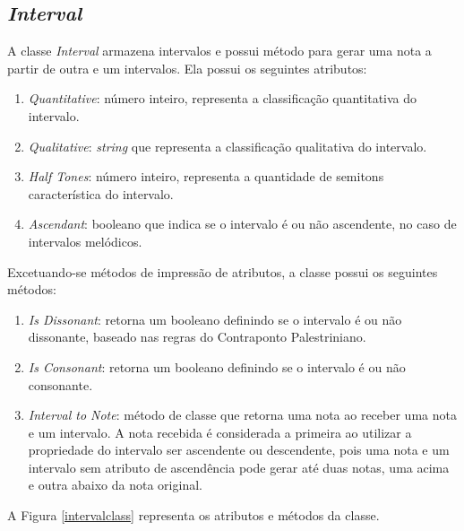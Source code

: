    \subsection[\textit{Interval}]{\textit{Interval}}

      A classe \textit{Interval} armazena intervalos e possui método para gerar uma nota a partir de outra e um intervalos. Ela possui os seguintes atributos:

      \begin{enumerate}
        \item \textit{Quantitative}: número inteiro, representa a classificação quantitativa do intervalo.
        \item \textit{Qualitative}: \textit{string} que representa a classificação qualitativa do intervalo.
        \item \textit{Half Tones}: número inteiro, representa a quantidade de semitons característica do intervalo.
        \item \textit{Ascendant}: booleano que indica se o intervalo é ou não ascendente, no caso de intervalos melódicos.
      \end{enumerate}

      Excetuando-se métodos de impressão de atributos, a classe possui os seguintes métodos:

      \begin{enumerate}
        \item \textit{Is Dissonant}: retorna um booleano definindo se o intervalo é ou não dissonante, baseado nas regras do Contraponto Palestriniano.
        \item \textit{Is Consonant}: retorna um booleano definindo se o intervalo é ou não consonante.
        \item \textit{Interval to Note}: método de classe que retorna uma nota ao receber uma nota e um intervalo. A nota recebida é considerada a primeira ao utilizar a propriedade do intervalo ser ascendente ou descendente, pois uma nota e um intervalo sem atributo de ascendência pode gerar até duas notas, uma acima e outra abaixo da nota original.
      \end{enumerate}

      A Figura \ref{intervalclass} representa os atributos e métodos da classe.

